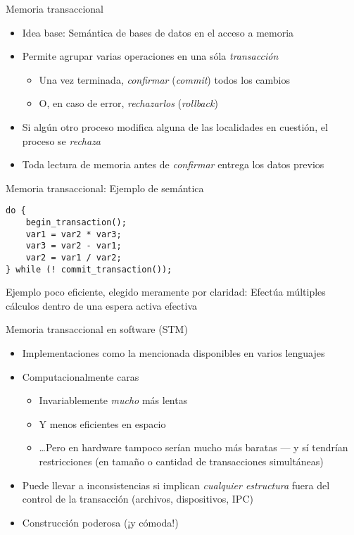 \documentclass[presentation]{beamer}
\begin{document}
\begin{frame}[label={sec:orgbdc9dfa}]{Memoria transaccional}
\begin{itemize}
\item Idea base: Semántica de bases de datos en el acceso a memoria
\item Permite agrupar varias operaciones en una sóla \emph{transacción}
\begin{itemize}
\item Una vez terminada, \emph{confirmar} (\emph{commit}) todos los cambios
\item O, en caso de error, \emph{rechazarlos} (\emph{rollback})
\end{itemize}
\item Si algún otro proceso modifica alguna de las localidades en
cuestión, el proceso se \emph{rechaza}
\item Toda lectura de memoria antes de \emph{confirmar} entrega los datos
previos
\end{itemize}
\end{frame}

\begin{frame}[label={sec:org4f4ff23},fragile]{Memoria transaccional: Ejemplo de semántica}
 \begin{verbatim}
do {
    begin_transaction();
    var1 = var2 * var3;
    var3 = var2 - var1;
    var2 = var1 / var2;
} while (! commit_transaction());
\end{verbatim}

Ejemplo poco eficiente, elegido meramente por claridad: Efectúa
múltiples cálculos dentro de una espera activa efectiva
\end{frame}

\begin{frame}[label={sec:org5f13c71}]{Memoria transaccional en software (STM)}
\begin{itemize}
\item Implementaciones como la mencionada disponibles en varios lenguajes
\item Computacionalmente caras
\begin{itemize}
\item Invariablemente \emph{mucho} más lentas
\item Y menos eficientes en espacio
\item \ldots{}Pero en hardware tampoco serían mucho más baratas — y sí
tendrían restricciones (en tamaño o cantidad de transacciones
simultáneas)
\end{itemize}
\item Puede llevar a inconsistencias si implican \emph{cualquier estructura}
fuera del control de la transacción (archivos, dispositivos, IPC)
\item Construcción poderosa (¡y cómoda!)
\end{itemize}
\end{frame}
\end{document}

